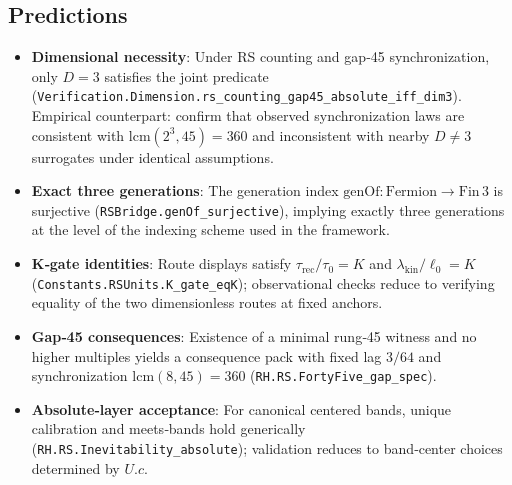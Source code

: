 \documentclass{article}
\begin{document}
\subsection{Predictions}
\begin{itemize}[leftmargin=*]
  \item \textbf{Dimensional necessity}: Under RS counting and gap‑45 synchronization, only \(D=3\) satisfies the joint predicate (\texttt{Verification.Dimension.rs\_counting\_gap45\_absolute\_iff\_dim3}). Empirical counterpart: confirm that observed synchronization laws are consistent with \(\mathrm{lcm}(2^3,45)=360\) and inconsistent with nearby \(D\neq3\) surrogates under identical assumptions.
  \item \textbf{Exact three generations}: The generation index \(\mathrm{genOf}: \mathrm{Fermion}\to \mathrm{Fin}\,3\) is surjective (\texttt{RSBridge.genOf\_surjective}), implying exactly three generations at the level of the indexing scheme used in the framework.
  \item \textbf{K‑gate identities}: Route displays satisfy \(\tau_{\mathrm{rec}}/\tau_0 = K\) and \(\lambda_{\mathrm{kin}}/\ell_0 = K\) (\texttt{Constants.RSUnits.K\_gate\_eqK}); observational checks reduce to verifying equality of the two dimensionless routes at fixed anchors.
  \item \textbf{Gap‑45 consequences}: Existence of a minimal rung‑45 witness and no higher multiples yields a consequence pack with fixed lag \(3/64\) and synchronization \(\mathrm{lcm}(8,45)=360\) (\texttt{RH.RS.FortyFive\_gap\_spec}).
  \item \textbf{Absolute‑layer acceptance}: For canonical centered bands, unique calibration and meets‑bands hold generically (\texttt{RH.RS.Inevitability\_absolute}); validation reduces to band‑center choices determined by \(U.c\).
\end{itemize}
\end{document}
